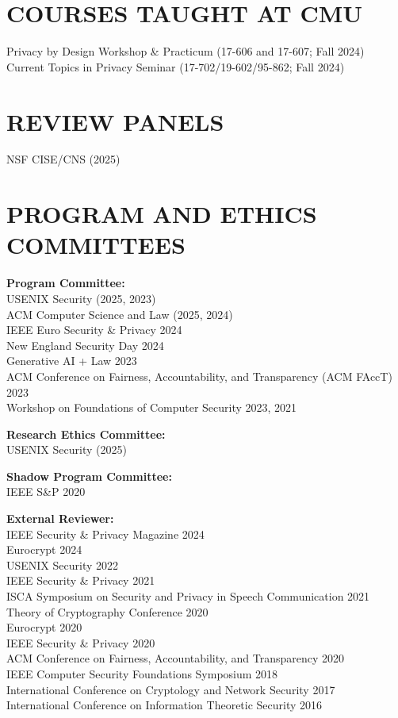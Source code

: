 \documentclass{res}
\begin{document}
\begin{resume}
\section{COURSES TAUGHT AT CMU}
Privacy by Design Workshop \& Practicum (17-606 and 17-607; Fall 2024) \\
Current Topics in Privacy Seminar (17-702/19-602/95-862; Fall 2024)

\section{REVIEW PANELS}
\vspace{0.1in}
NSF CISE/CNS (2025) \\


\section{PROGRAM AND ETHICS COMMITTEES}
\vspace{0.1in}

\textbf{Program Committee:} \\
USENIX Security (2025, 2023) \\
ACM Computer Science and Law (2025, 2024) \\
IEEE Euro Security \& Privacy 2024 \\
New England Security Day 2024 \\
Generative AI + Law 2023 \\
ACM Conference on Fairness, Accountability, and Transparency (ACM FAccT) 2023 \\
Workshop on Foundations of Computer Security 2023, 2021

\textbf{Research Ethics Committee:} \\
USENIX Security (2025)

\textbf{Shadow Program Committee:} \\
IEEE S\&P 2020

\textbf{External Reviewer:} \\
IEEE Security \& Privacy Magazine 2024 \\
Eurocrypt 2024 \\
USENIX Security 2022 \\
IEEE Security \& Privacy 2021 \\
ISCA Symposium on Security and Privacy in Speech Communication 2021 \\
Theory of Cryptography Conference 2020 \\
Eurocrypt 2020 \\
IEEE Security \& Privacy 2020 \\
ACM Conference on Fairness, Accountability, and Transparency 2020 \\
IEEE Computer Security Foundations Symposium 2018 \\
International Conference on Cryptology and Network Security 2017 \\
International Conference on Information Theoretic Security 2016



\end{resume}
\end{document}
